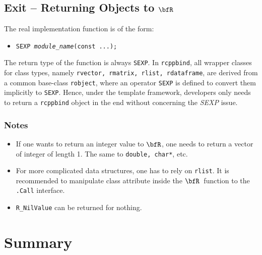 \documentclass{article}
\newcommand{\R}{$\bfR$}
\begin{document}
\subsection{Exit -- Returning Objects to \R}

The real implementation function is of the form:
\begin{itemize}
  \item[] \texttt{SEXP \textsl{module\_name}(const ...);}
\end{itemize}
The return type of the function is always \texttt{SEXP}. In
\texttt{rcppbind}, all wrapper classes for class types,
namely \texttt{rvector, rmatrix, rlist, rdataframe}, are
derived from a common base-class \texttt{robject}, where an
operator \texttt{SEXP} is defined to convert them implicitly
to \texttt{SEXP}. Hence, under the template framework,
developers only needs to return a \texttt{rcppbind} object
in the end without concerning the \textsl{SEXP} issue.

\subsubsection*{Notes}

\begin{itemize}
  \item If one wants to return an integer value to \R, one
    needs to return a vector of integer of length 1.  The
    same to \texttt{double, char*}, etc.
  \item For more complicated data structures, one has to rely
    on \texttt{rlist}. It is recommended to manipulate class
    attribute inside the \R\ function to the \texttt{.Call}
    interface.
  \item \texttt{R\_NilValue} can be returned for nothing.
\end{itemize}

\section{Summary}\label{sec:summary}
\end{document}
